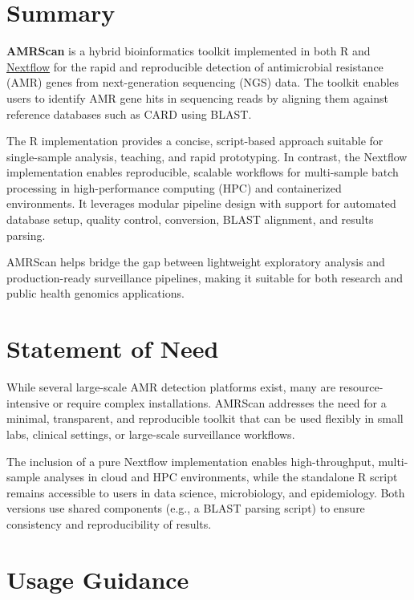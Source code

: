 \section{Summary}\label{summary}

\textbf{AMRScan} is a hybrid bioinformatics toolkit implemented in both
R and \href{https://www.nextflow.io/}{Nextflow} for the rapid and
reproducible detection of antimicrobial resistance (AMR) genes from
next-generation sequencing (NGS) data. The toolkit enables users to
identify AMR gene hits in sequencing reads by aligning them against
reference databases such as CARD using BLAST.

The R implementation provides a concise, script-based approach suitable
for single-sample analysis, teaching, and rapid prototyping. In
contrast, the Nextflow implementation enables reproducible, scalable
workflows for multi-sample batch processing in high-performance
computing (HPC) and containerized environments. It leverages modular
pipeline design with support for automated database setup, quality
control, conversion, BLAST alignment, and results parsing.

AMRScan helps bridge the gap between lightweight exploratory analysis
and production-ready surveillance pipelines, making it suitable for both
research and public health genomics applications.

\section{Statement of Need}\label{statement-of-need}

While several large-scale AMR detection platforms exist, many are
resource-intensive or require complex installations. AMRScan addresses
the need for a minimal, transparent, and reproducible toolkit that can
be used flexibly in small labs, clinical settings, or large-scale
surveillance workflows.

The inclusion of a pure Nextflow implementation enables high-throughput,
multi-sample analyses in cloud and HPC environments, while the
standalone R script remains accessible to users in data science,
microbiology, and epidemiology. Both versions use shared components
(e.g., a BLAST parsing script) to ensure consistency and reproducibility
of results.

\section{Usage Guidance}\label{usage-guidance}

